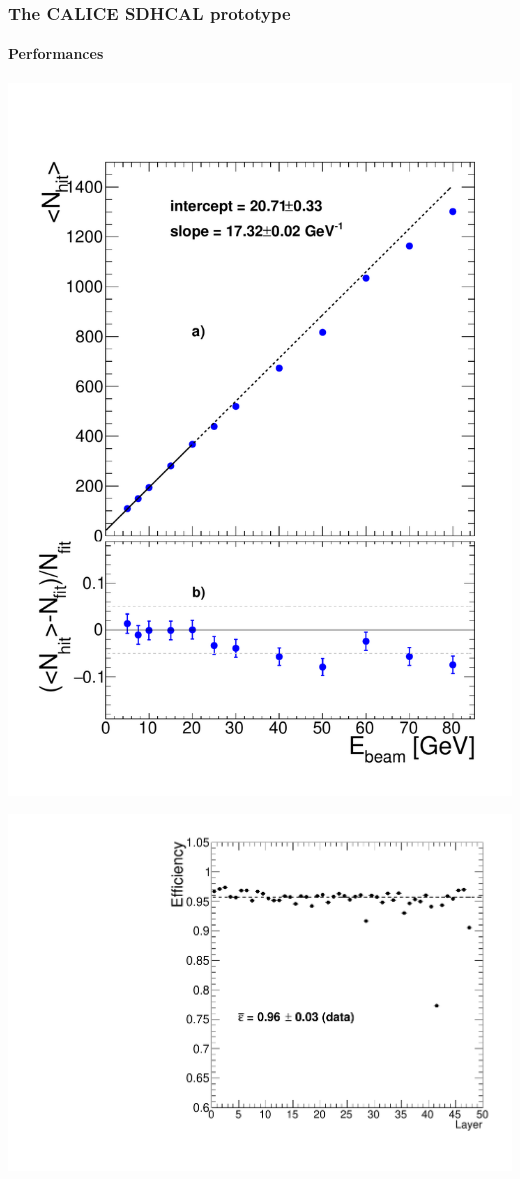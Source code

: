 \documentclass[8pt]{beamer}
\begin{document}
    
  \begin{frame}
  \frametitle{The CALICE SDHCAL prototype}
  \framesubtitle{Performances}
    \begin{minipage}{0.48\linewidth}
      \includegraphics[width=1.2\linewidth]{NHITPION.pdf}
    \end{minipage} \hfill
    \begin{minipage}{0.48\linewidth}
      \begin{center}
        \includegraphics[width=0.7\linewidth]{eff_2012.pdf} \\

\end{center}
\end{minipage}
\end{frame}
\end{document}
